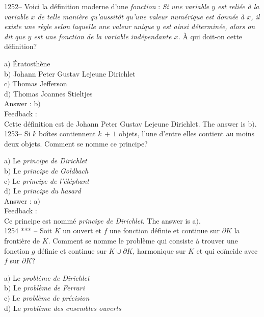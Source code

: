 \documentclass[letterpaper, 12pt]{article}
\begin{document}
1252-- Voici la d\'efinition moderne d'une {\sl fonction} : {\sl Si
une variable $y$ est reli\'ee \`a la variable $x$ de telle mani\`ere
qu'aussit\^ot qu'une valeur num\'erique est donn\'ee \`a $x$, il
existe une r\`egle selon laquelle une valeur unique $y$ est ainsi
d\'etermin\'ee, alors on dit que $y$ est une fonction de la variable
ind\'ependante $x$.} \`A qui doit-on cette d\'efinition?

a$)$ \'Eratosth\`ene \\
b$)$ Johann Peter Gustav Lejeune Dirichlet \\
c$)$ Thomas Jefferson \\
d$)$ Thomas Joannes Stieltjes\\

Answer : b$)$\\

Feedback : \\
Cette d\'efinition est de Johann Peter Gustav Lejeune Dirichlet.
The answer is b$)$.\\

1253-- Si $k$ bo\^ites contiennent $k\,+\,1$ objets, l'une d'entre
elles contient au moins deux objets. Comment se nomme ce principe?

a$)$ Le {\sl principe de Dirichlet} \\
b$)$ Le {\sl principe de Goldbach} \\
c$)$ Le {\sl principe de l'\'el\'ephant} \\
d$)$ Le {\sl principe du hasard}\\

Answer : a$)$\\

Feedback : \\
Ce principe est nomm\'e {\sl principe de Dirichlet}.
The answer is a$)$.\\

1254 *** -- Soit $K$ un ouvert et $f$ une fonction d\'efinie et
continue sur $\partial K$  la fronti\`ere de $K$. Comment se nomme
le probl\`eme qui consiste \`a trouver une fonction $g$ d\'efinie et
continue sur $K\cup\partial K$, harmonique sur $K$ et qui co\"incide
avec $f$ sur $\partial K$?

a$)$ Le {\sl probl\`eme de Dirichlet} \\
b$)$ Le {\sl probl\`eme de Ferrari} \\
c$)$ Le {\sl probl\`eme de pr\'ecision} \\
d$)$ Le {\sl probl\`eme des ensembles ouverts}\\
\end{document}
